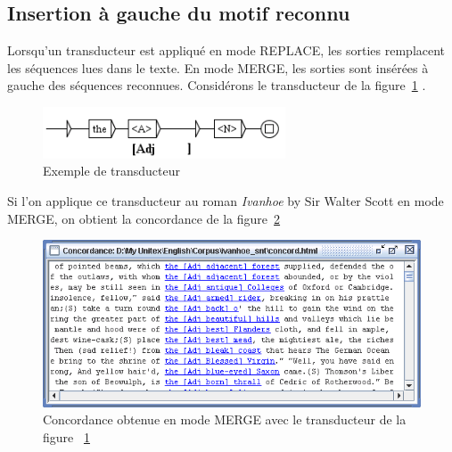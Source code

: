 \subsection{Insertion à gauche du motif reconnu}
Lorsqu’un transducteur est appliqué en mode REPLACE, les sorties remplacent les séquences lues dans le texte. 
En mode MERGE, les sorties sont insérées à gauche des séquences reconnues. Considérons le
transducteur de la figure~\ref{fig-transducer-example}
. 

\begin{figure}[!h]
\begin{center}
\includegraphics[width=7.2cm]{resources/img/fig6-22.png}
\caption{Exemple de transducteur\label{fig-transducer-example}}
\end{center}
\end{figure}

\bigskip
\noindent 
\noindent Si l’on applique ce transducteur au roman  \textit{Ivanhoe} by Sir Walter Scott
en mode MERGE, on obtient la concordance de la figure~\ref{fig-transducer-example-concordance} 


\begin{figure}[!h]
\begin{center}
\includegraphics[width=14.4cm]{resources/img/fig6-23.png}
\caption{Concordance obtenue en mode MERGE avec le transducteur de la figure
~\ref{fig-transducer-example}\label{fig-transducer-example-concordance}}
\end{center}
\end{figure}

